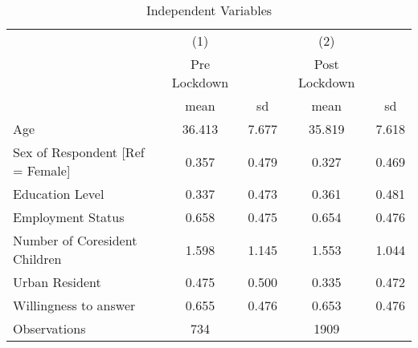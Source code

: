 \begin{table}[htbp]\centering
\def\sym#1{\ifmmode^{#1}\else\(^{#1}\)\fi}
\caption{Independent Variables}
\begin{tabular}{l*{2}{cc}}
\hline\hline
                    &\multicolumn{1}{c}{(1)}&            &\multicolumn{1}{c}{(2)}&            \\
                    &Pre Lockdown&            &Post Lockdown&            \\
                    &        mean&          sd&        mean&          sd\\
\hline
Age                 &      36.413&       7.677&      35.819&       7.618\\
Sex of Respondent [Ref = Female]&       0.357&       0.479&       0.327&       0.469\\
Education Level     &       0.337&       0.473&       0.361&       0.481\\
Employment Status   &       0.658&       0.475&       0.654&       0.476\\
Number of Coresident Children&       1.598&       1.145&       1.553&       1.044\\
Urban Resident      &       0.475&       0.500&       0.335&       0.472\\
Willingness to answer&       0.655&       0.476&       0.653&       0.476\\
\hline
Observations        &         734&            &        1909&            \\
\hline\hline
\end{tabular}
\end{table}
